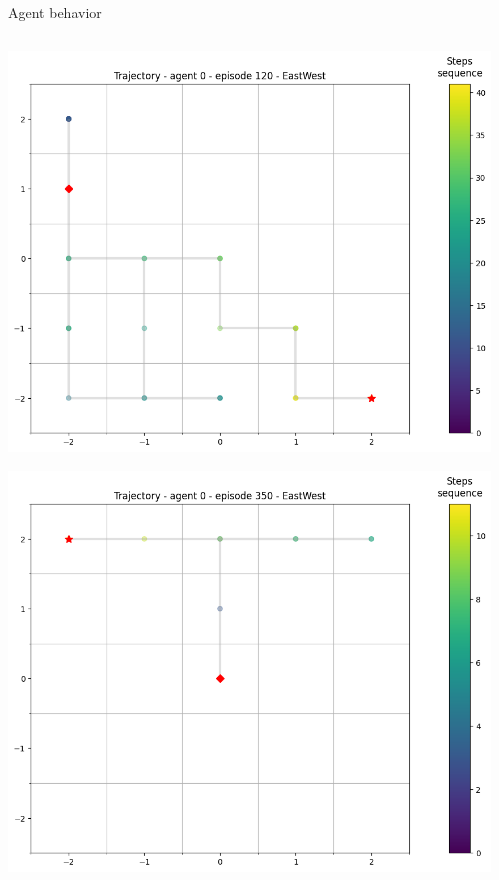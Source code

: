 \documentclass[bigger]{beamer}
\begin{document}
\begin{frame}[label={sec:org3d777c1}]{Agent behavior}
\begin{columns}
\begin{column}[c]{0.3\columnwidth}
\begin{center}
\includegraphics[height=0.28\textheight]{img/trajectory-0-120-EastWest.png}
\end{center}
\begin{center}
\includegraphics[height=0.28\textheight]{img/trajectory-0-350-EastWest.png}
\end{center}
\end{column}
\begin{column}[c]{0.25\columnwidth}
\begin{center}

\end{center}
\end{column}
\end{columns}
\end{frame}
\end{document}
